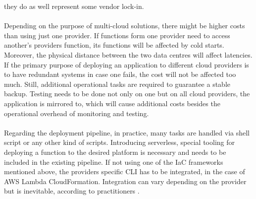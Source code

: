 \documentclass[11pt]{article}
\begin{document}
they do as well represent some vendor lock-in.\\\\ Depending on the purpose of multi-cloud solutions, there might be higher costs than using just one provider. If functions form one provider need to access another's providers function, its functions will be affected by cold starts. Moreover, the physical distance between the two data centres will affect latencies. If the primary purpose of deploying an application to different cloud providers is to have redundant systems in case one fails, the cost will not be affected too much. Still, additional operational tasks are required to guarantee a stable backup. Testing needs to be done not only on one but on all cloud providers, the application is mirrored to, which will cause additional costs besides the operational overhead of monitoring and testing.\\\\ Regarding the deployment pipeline, in practice, many tasks are handled via shell script or any other kind of scripts. Introducing serverless, special tooling for deploying a function to the desired platform is necessary and needs to be included in the existing pipeline. If not using one of the IaC frameworks mentioned above, the providers specific CLI has to be integrated, in the case of AWS Lambda CloudFormation. Integration can vary depending on the provider but is inevitable, according to practitioners \cite{ivanov2018implementation}.
\end{document}
